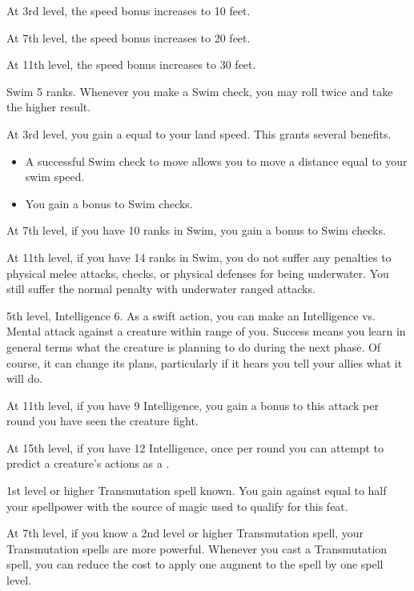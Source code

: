     At 3rd level, the speed bonus increases to 10 feet.

    At 7th level, the speed bonus increases to 20 feet.

    At 11th level, the speed bonus increases to 30 feet.

    \featpre Swim 5 ranks.
    \featben Whenever you make a Swim check, you may roll twice and take the higher result.

    At 3rd level, you gain a  equal to your land speed.
    This grants several benefits.
    \begin{itemize}
        \item A successful Swim check to move allows you to move a distance equal to your swim speed.
        \item You gain a  bonus to Swim checks.
    \end{itemize}

    At 7th level, if you have 10 ranks in Swim, you gain a  bonus to Swim checks.

    At 11th level, if you have 14 ranks in Swim, you do not suffer any penalties to physical melee attacks, checks, or physical defenses for being underwater.
    You still suffer the normal penalty with underwater ranged attacks.

    \featpres 5th level, Intelligence 6.
    \featben As a swift action, you can make an Intelligence vs. Mental attack against a creature within \rngmed range of you.
    Success means you learn in general terms what the creature is planning to do during the next phase.
    Of course, it can change its plans, particularly if it hears you tell your allies what it will do.

    At 11th level, if you have 9 Intelligence, you gain a  bonus to this attack per round you have seen the creature fight.

    At 15th level, if you have 12 Intelligence, once per round you can attempt to predict a creature's actions as a .

    \featpre 1st level or higher Transmutation spell known.
    \featben You gain  against  equal to half your spellpower with the source of magic used to qualify for this feat.

    At 7th level, if you know a 2nd level or higher Transmutation spell, your Transmutation spells are more powerful.
    Whenever you cast a Transmutation spell, you can reduce the cost to apply one augment to the spell by one spell level.

